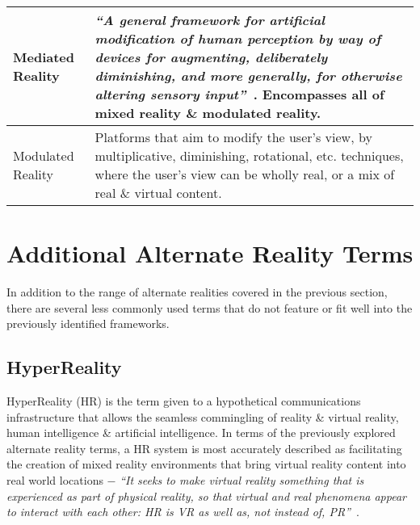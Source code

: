 \begin{center}
\begin{longtable}{| l | p{10cm} |}
\hline


Mediated Reality & \textit{``A general framework for artificial modification of human perception by way of devices for augmenting, deliberately diminishing, and more generally, for otherwise altering sensory input''}~\cite{Mann2002a}. Encompasses all of mixed reality \& modulated reality. \\

\hline


Modulated Reality & Platforms that aim to modify the user's view, by multiplicative, diminishing, rotational, etc. techniques, where the user's view can be wholly real, or a mix of real \& virtual content. \\

\hline

\end{longtable}
\end{center}


\section{Additional Alternate Reality Terms}

In addition to the range of alternate realities covered in the previous section, there are several less commonly used terms that do not feature or fit well into the previously identified frameworks.


\subsection{HyperReality}
\label{subsec_HyperReality}

HyperReality (HR) is the term given to a hypothetical communications infrastructure that allows the seamless commingling of reality \& virtual reality, human intelligence \& artificial intelligence. In terms of the previously explored alternate reality terms, a HR system is most accurately described as facilitating the creation of mixed reality environments that bring virtual reality content into real world locations $-$ \textit{``It seeks to make virtual reality something that is experienced as part of physical reality, so that virtual and real phenomena appear to interact with each other: HR is VR as well as, not instead of, PR''}~\cite{Terashima2001}.

